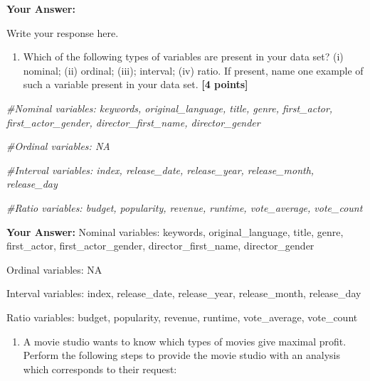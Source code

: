 \documentclass[
]{article}
\newenvironment{Shaded}{\begin{snugshade}}{\end{snugshade}}
\newcommand{\CommentTok}[1]{\textcolor[rgb]{0.56,0.35,0.01}{\textit{#1}}}
\providecommand{\tightlist}{%
  \setlength{\itemsep}{0pt}\setlength{\parskip}{0pt}}
\begin{document}
\textbf{Your Answer:}

Write your response here.

\begin{enumerate}
\def\labelenumi{\arabic{enumi}.}
\setcounter{enumi}{1}
\tightlist
\item
  Which of the following types of variables are present in your data
  set? (i) nominal; (ii) ordinal; (iii); interval; (iv) ratio. If
  present, name one example of such a variable present in your data set.
  \textbf{[4 points]}
\end{enumerate}

\begin{Shaded}
\begin{Highlighting}[]
\CommentTok{\#Nominal variables: keywords, original\_language, title, genre, first\_actor, first\_actor\_gender, director\_first\_name, director\_gender}

\CommentTok{\#Ordinal variables: NA}

\CommentTok{\#Interval variables: index, release\_date, release\_year, release\_month, release\_day}

\CommentTok{\#Ratio variables: budget, popularity, revenue, runtime, vote\_average, vote\_count }
\end{Highlighting}
\end{Shaded}

\textbf{Your Answer:} Nominal variables: keywords, original\_language,
title, genre, first\_actor, first\_actor\_gender, director\_first\_name,
director\_gender

Ordinal variables: NA

Interval variables: index, release\_date, release\_year, release\_month,
release\_day

Ratio variables: budget, popularity, revenue, runtime, vote\_average,
vote\_count

\begin{enumerate}
\def\labelenumi{\arabic{enumi}.}
\setcounter{enumi}{2}
\tightlist
\item
  A movie studio wants to know which types of movies give maximal
  profit. Perform the following steps to provide the movie studio with
  an analysis which corresponds to their request:
\end{enumerate}
\end{document}
